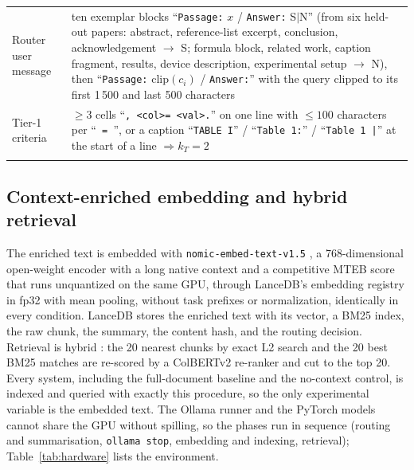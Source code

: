 \documentclass[pdflatex,sn-mathphys-num]{sn-jnl}
\theoremstyle{thmstyleone}%
\theoremstyle{thmstylethree}%
\begin{document}
\begin{table}[htbp]
\begin{tabular}{@{}p{2.6cm}p{10.0cm}@{}}
Router user message & ten exemplar blocks ``\texttt{Passage:} $x$ / \texttt{Answer:} S$\mid$N'' (from six held-out papers: abstract, reference-list excerpt, conclusion, acknowledgement $\to$ S; formula block, related work, caption fragment, results, device description, experimental setup $\to$ N), then ``\texttt{Passage:} $\mathrm{clip}(c_i)$ / \texttt{Answer:}'' with the query clipped to its first 1\,500 and last 500 characters \\
Tier-1 criteria & $\ge 3$ cells ``\texttt{, \textless col\textgreater = \textless val\textgreater.}'' on one line with $\le 100$ characters per ``\texttt{ = }'', or a caption ``\texttt{TABLE I}'' / ``\texttt{Table 1:}'' / ``\texttt{Table 1 |}'' at the start of a line $\Rightarrow k_T=2$ \\
\botrule
\end{tabular}
\end{table}

\subsection{Context-enriched embedding and hybrid retrieval}\label{sec:retrieval}

The enriched text is embedded with \texttt{nomic-embed-text-v1.5} \cite{nussbaum2024nomic}, a 768-dimensional open-weight encoder with a long native context and a competitive MTEB score \cite{muennighoff2023mteb} that runs unquantized on the same GPU, through LanceDB's embedding registry \cite{lancedb} in fp32 with mean pooling, without task prefixes or normalization, identically in every condition. LanceDB stores the enriched text with its vector, a BM25 index, the raw chunk, the summary, the content hash, and the routing decision. Retrieval is hybrid \cite{kiran2025hybrid,wang2024searching}: the 20 nearest chunks by exact L2 search and the 20 best BM25 matches \cite{robertson1995okapi,robertson2009bm25} are re-scored by a ColBERTv2 re-ranker \cite{khattab2020colbert,santhanam2022colbertv2} and cut to the top 20. Every system, including the full-document baseline and the no-context control, is indexed and queried with exactly this procedure, so the only experimental variable is the embedded text. The Ollama runner and the PyTorch models cannot share the GPU without spilling, so the phases run in sequence (routing and summarisation, \texttt{ollama stop}, embedding and indexing, retrieval); Table~\ref{tab:hardware} lists the environment.
\end{document}
